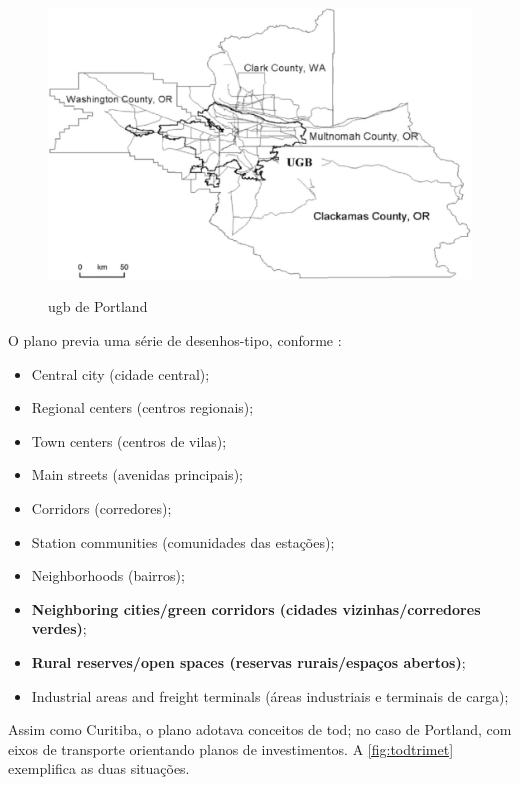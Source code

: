 	\begin{figure}
		\centering
		\caption{\glsdesc{ugb} de Portland}
		\includegraphics[width=0.9\linewidth]{img/jun2004a_01}
		\label{fig:ugbjun}
	\end{figure}
	
	O plano previa uma série de desenhos-tipo, conforme \cite[p. 10--11, tradução e grifo nossos]{metro2000a}:
	
	\begin{itemize}
		\item Central city (cidade central);
		\item Regional centers (centros regionais);
		\item Town centers (centros de vilas);
		\item Main streets (avenidas principais);
		\item Corridors (corredores);
		\item Station communities (comunidades das estações);
		\item Neighborhoods (bairros);
		\item \textbf{Neighboring cities/green corridors (cidades vizinhas/corredores verdes)};
		\item \textbf{Rural reserves/open spaces (reservas rurais/espaços abertos)};
		\item Industrial areas and freight terminals (áreas industriais e terminais de carga);
	\end{itemize}
	
	Assim como Curitiba, o plano adotava conceitos de \gls{tod}; no caso de Portland, com eixos de transporte orientando planos de investimentos. A \autoref{fig:todtrimet} exemplifica as duas situações.
	
